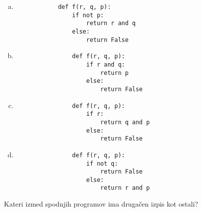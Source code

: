 \documentclass[arhiv, 10pt]{../izpit}
\begin{document}
        \begin{multicols}{2}
        \begin{enumerate}[(a)]
\item 
            \begin{verbatim}
            def f(r, q, p):
                if not p:
                    return r and q
                else:
                    return False
            \end{verbatim}
        
\item 
                \begin{verbatim}
                def f(r, q, p):
                    if r and q:
                        return p
                    else:
                        return False
                \end{verbatim}
            
\item 
                \begin{verbatim}
                def f(r, q, p):
                    if r:
                        return q and p
                    else:
                        return False
                \end{verbatim}
            
\item 
                \begin{verbatim}
                def f(r, q, p):
                    if not q:
                        return False
                    else:
                        return r and p
                \end{verbatim}
            
\end{enumerate}

        \end{multicols}
    
        \naloga*
        
        Kateri izmed spodnjih programov ima drugačen izpis kot ostali?
    
\end{document}
